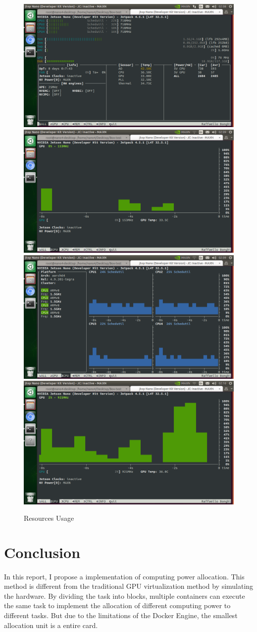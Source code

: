 \documentclass{article}
\begin{document}
        \begin{figure}[H]
            \centering
            \includegraphics[width=.4\textwidth]{img/report7.png}
            \includegraphics[width=.4\textwidth]{img/report8.png}
            \includegraphics[width=.4\textwidth]{img/report9.png}
            \includegraphics[width=.4\textwidth]{img/report10.png}
            \caption{Resources Usage}
            \label{img6}
        \end{figure}
    \section{Conclusion}
        \paragraph{}
        In this report, I propose a implementation of computing power allocation. This method is different from the traditional GPU virtualization method by simulating the hardware. By dividing the task into blocks, multiple containers can execute the same task to implement the allocation of different computing power to different tasks. But due to the limitations of the Docker Engine, the smallest allocation unit is a entire card.
    
\end{document}
